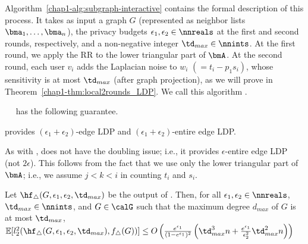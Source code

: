 Algorithm~\ref{chap1-alg:subgraph-interactive} contains the formal
description of this process. 
It takes as input a graph $G$ (represented as neighbor lists $\bma_1, \ldots, \bma_n$), the privacy budgets $\epsilon_1, \epsilon_2 \in \nnreals$ at the first and second rounds, respectively, 
and 
a non-negative integer $\td_{max} \in \nnints$. 
At the first round, we apply the RR to the lower triangular part of $\bmA$. 
At the second round, each user $v_i$ adds the Laplacian noise to $w_i$ $(= t_i - p_1 s _i)$, whose 
sensitivity is at most 
$\td_{max}$ (after graph projection), 
as we will prove in Theorem~\ref{chap1-thm:local2rounds_LDP}. 
We call this algorithm .


\smallskip
{}~~ 
has the following 
guarantee.

\begin{theorem}\label{chap1-thm:local2rounds_LDP}
  provides $(\epsilon_1 + \epsilon_2)$-edge LDP and $(\epsilon_1 + \epsilon_2)$-entire edge LDP.
\end{theorem}

As with ,  does not have the doubling issue; i.e., it provides $\epsilon$-entire edge LDP (not $2\epsilon$). 
This follows from the fact that we 
use only the lower triangular part of $\bmA$; 
i.e., we assume 
$j<k<i$ 
in counting $t_i$ and $s_i$. 

\begin{theorem}\label{chap1-thm:local2rounds}
  Let 
  $\hf_{\triangle}(G, \epsilon_1, \epsilon_2, \td_{max})$ 
  be the output of 
  . 
  Then, for all 
  $\epsilon_1,\epsilon_2 \in \nnreals$, 
  $\td_{max} \in \nnints$,
  and $G\in \calG$ such that the
  maximum degree $d_{max}$ of $G$ is 
  at most 
  $\td_{max}$,
  $\mathbb{E}[l_2^2(\hf_{\triangle}(G, \epsilon_1, \epsilon_2, \td_{max}), f_\triangle(G))] 
  \leq
    O\left(\frac{e^{\epsilon_1}}{(1-e^{\epsilon_1})^2} \left(\td_{max}^3 n +
    \frac{e^{\epsilon_1}}{\epsilon_2^2}\td_{max}^2 n\right)\right)$
\end{theorem}

